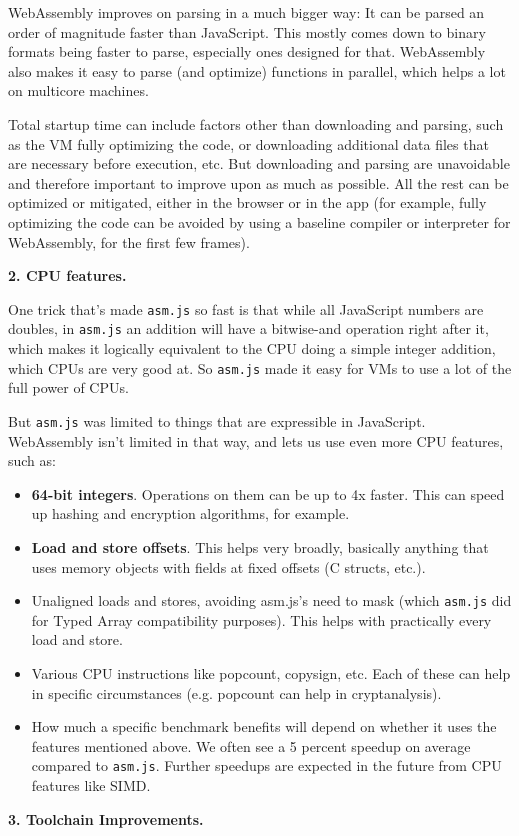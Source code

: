 WebAssembly improves on parsing in a much bigger way: It can be parsed an order of magnitude faster than JavaScript. This mostly comes down to binary formats being faster to parse, especially ones designed for that. WebAssembly also makes it easy to parse (and optimize) functions in parallel, which helps a lot on multicore machines.

Total startup time can include factors other than downloading and parsing, such as the VM fully optimizing the code, or downloading additional data files that are necessary before execution, etc. But downloading and parsing are unavoidable and therefore important to improve upon as much as possible. All the rest can be optimized or mitigated, either in the browser or in the app (for example, fully optimizing the code can be avoided by using a baseline compiler or interpreter for WebAssembly, for the first few frames).

\textbf{2. CPU features.}

One trick that’s made \texttt{asm.js} so fast is that while all JavaScript numbers are doubles, in \texttt{asm.js} an addition will have a bitwise-and operation right after it, which makes it logically equivalent to the CPU doing a simple integer addition, which CPUs are very good at. So \texttt{asm.js} made it easy for VMs to use a lot of the full power of CPUs.

But \texttt{asm.js} was limited to things that are expressible in JavaScript. WebAssembly isn’t limited in that way, and lets us use even more CPU features, such as:
\begin{itemize}
\item \textbf{64-bit integers}. Operations on them can be up to 4x faster. This can speed up hashing and encryption algorithms, for example.
\item \textbf{Load and store offsets}. This helps very broadly, basically anything that uses memory objects with fields at fixed offsets (C structs, etc.).
\item Unaligned loads and stores, avoiding asm.js’s need to mask (which \texttt{asm.js} did for Typed Array compatibility purposes). 
      This helps with practically every load and store.
\item Various CPU instructions like popcount, copysign, etc. Each of these can help in specific circumstances (e.g. popcount can help in cryptanalysis).
\item How much a specific benchmark benefits will depend on whether it uses the features mentioned above. 
      We often see a 5 percent speedup on average compared to \texttt{asm.js}. Further speedups are expected in the future from CPU features like SIMD.
\end{itemize}
\textbf{3. Toolchain Improvements.}

